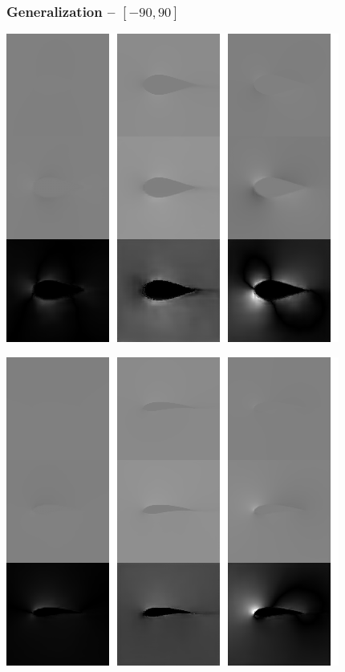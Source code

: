 \begin{frame}
    \frametitle{Generalization -- $[-90, 90]$}
    \vspace*{.1cm}
\begin{multicols}{2}
	
	\includegraphics[width=.9\columnwidth, height=.6\textheight]{./Ressourcen/Praesentation/Bilder/TransferEval/90/0035_bw.png}%
    \vfill\columnbreak
    
    \includegraphics[width=.9\columnwidth, height=.6\textheight]{./Ressourcen/Praesentation/Bilder/TransferEval/90/0067_bw.png}%
\end{multicols}
    
\end{frame}
\clearpage

